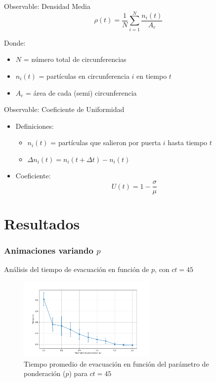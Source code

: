 \documentclass[aspectratio=169]{beamer}
\begin{document}
\begin{frame}{Observable: Densidad Media}
    \begin{equation}
        \rho(t) = \frac{1}{N} \sum_{i=1}^{N} \frac{n_i(t)}{A_c}
    \end{equation}
    
    Donde:
    \begin{itemize}
        \item $N$ = número total de circunferencias
        \item $n_i(t)$ = partículas en circunferencia $i$ en tiempo $t$
        \item $A_c$ = área de cada (semi) circunferencia
    \end{itemize}
\end{frame}

\begin{frame}{Observable: Coeficiente de Uniformidad}
    \begin{itemize}
        \item Definiciones:
        \begin{itemize}
            \item $n_i(t)$ = partículas que salieron por puerta $i$ hasta tiempo $t$
            \item $\Delta n_i(t) = n_i(t + \Delta t) - n_i(t)$
        \end{itemize}
        \item Coeficiente:
        \begin{equation}
            U(t) = 1 - \frac{\sigma}{\mu}
        \end{equation}
    \end{itemize}
\end{frame}


\section{Resultados}

\begin{frame}
    \frametitle{Animaciones variando $p$}
\end{frame}

\begin{frame}{Análisis del tiempo de evacuación en función de $p$, con $ct=45$}
    \begin{figure}
        \centering
        \includegraphics[width=0.60\textwidth]{img/evacuation_times_t_45.png}
        \caption{Tiempo promedio de evacuación en función del parámetro de ponderación ($p$) para $ct=45$}
    \end{figure}
\end{frame}
\end{document}

